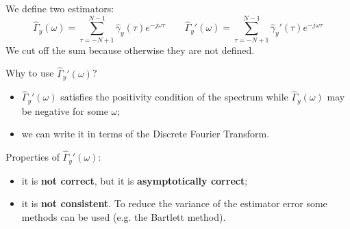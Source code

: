 We define two estimators:
\[
	\boxed{\hat{\Gamma}_{y}(\omega) = \sum_{\tau = -N+1}^{N-1} \hat{\gamma}_{y}(\tau) e^{-j\omega\tau}}
	\qquad
	\boxed{\hat{\Gamma}_{y}'(\omega) = \sum_{\tau = -N+1}^{N-1} \hat{\gamma}_{y}'(\tau) e^{-j\omega\tau}}
\]
We cut off the sum because otherwise they are not defined.

Why to use $\hat{\Gamma}_{y}'(\omega)$?
\begin{itemize}
	\item $\hat{\Gamma}_{y}'(\omega)$ satisfies the positivity condition of the spectrum while $\hat{\Gamma}_{y}(\omega)$ may be negative for some $\omega$;
	\item we can write it in terms of the Discrete Fourier Transform.
\end{itemize}

Properties of $\hat{\Gamma}_{y}'(\omega)$:
\begin{itemize}
	\item it is \textbf{not correct}, but it is \textbf{asymptotically correct};
	\item it is \textbf{not consistent}. To reduce the variance of the estimator error some methods can be used (e.g. the Bartlett method).
\end{itemize}